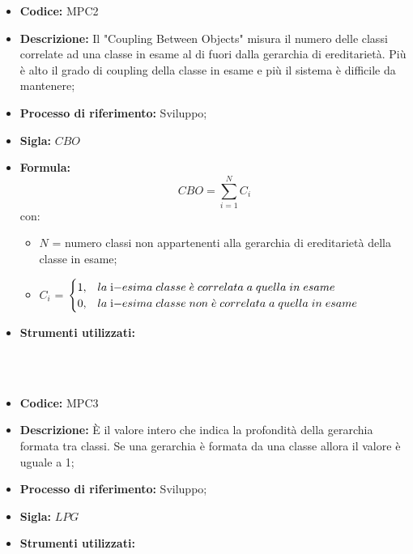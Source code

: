     \begin{itemize}
        \item \textbf{Codice:} MPC2
        \item \textbf{Descrizione:} Il "Coupling Between Objects" misura il numero delle classi correlate ad una classe in esame al di fuori dalla gerarchia di ereditarietà. Più è alto il grado di coupling della classe in esame e più il sistema è difficile da mantenere;
        \item \textbf{Processo di riferimento:} Sviluppo;
        \item \textbf{Sigla:} $CBO$
        \item \textbf{Formula:} $$CBO = {\sum_{i=1}^{N} C_i}$$
        con:
        \begin{itemize}
            \item $N$ = numero classi non appartenenti alla gerarchia di ereditarietà della classe in esame;
            \item $C_i$ =
            \begin{math} {
                \begin{cases}
                    1, & la \; $i$-esima \; classe \; \grave{e} \; correlata \; a \; quella \; in \; esame \\
                    0, & la \; $i$-esima \; classe \; non \; \grave{e} \; correlata \; a \; quella \; in \; esame
                \end{cases}
            }
            \end{math}
        \end{itemize}
        \item \textbf{Strumenti utilizzati:}
    \end{itemize}

    \mbox{}\\ \\
    \begin{itemize}
        \item \textbf{Codice:} MPC3
        \item \textbf{Descrizione:} È il valore intero che indica la profondità della gerarchia formata tra classi. Se una gerarchia è formata da una classe allora il valore è uguale a 1;
        \item \textbf{Processo di riferimento:} Sviluppo;
        \item \textbf{Sigla:} $LPG$
        \item \textbf{Strumenti utilizzati:}
    \end{itemize}

